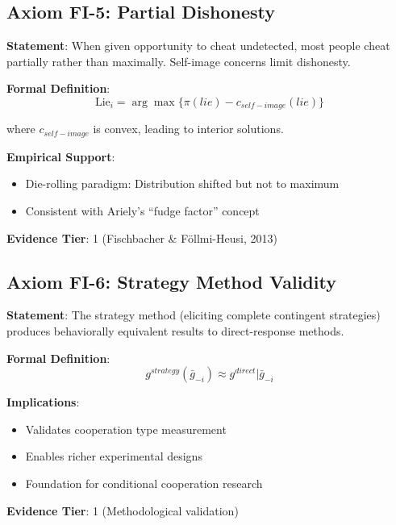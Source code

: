\subsection{Axiom FI-5: Partial Dishonesty}

\begin{tcolorbox}[colback=red!5!white,colframe=red!75!black,title=Axiom FI-5: Partial Dishonesty]
\textbf{Statement}: When given opportunity to cheat undetected, most people cheat partially rather than maximally. Self-image concerns limit dishonesty.

\textbf{Formal Definition}:
\begin{equation}
\text{Lie}_i = \arg\max \{ \pi(lie) - c_{self-image}(lie) \}
\end{equation}

where $c_{self-image}$ is convex, leading to interior solutions.

\textbf{Empirical Support}:
\begin{itemize}
    \item Die-rolling paradigm: Distribution shifted but not to maximum
    \item Consistent with Ariely's ``fudge factor'' concept
\end{itemize}

\textbf{Evidence Tier}: 1 (Fischbacher \& Föllmi-Heusi, 2013)
\end{tcolorbox}

\subsection{Axiom FI-6: Strategy Method Validity}

\begin{tcolorbox}[colback=green!5!white,colframe=green!75!black,title=Axiom FI-6: Strategy Method Validity]
\textbf{Statement}: The strategy method (eliciting complete contingent strategies) produces behaviorally equivalent results to direct-response methods.

\textbf{Formal Definition}:
\begin{equation}
g^{strategy}(\bar{g}_{-i}) \approx g^{direct}|\bar{g}_{-i}
\end{equation}

\textbf{Implications}:
\begin{itemize}
    \item Validates cooperation type measurement
    \item Enables richer experimental designs
    \item Foundation for conditional cooperation research
\end{itemize}

\textbf{Evidence Tier}: 1 (Methodological validation)
\end{tcolorbox}

